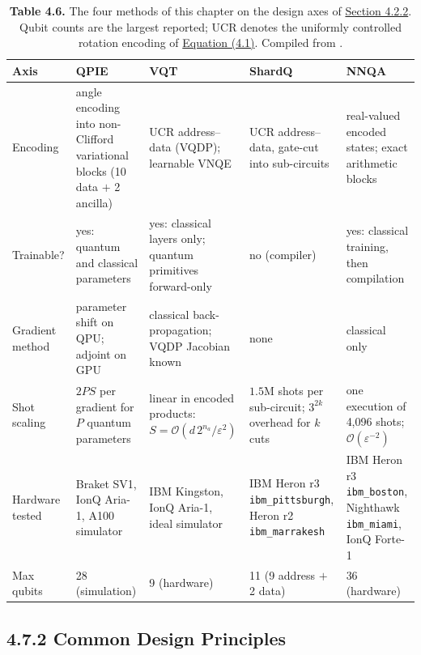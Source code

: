 \documentclass{report}
\theoremstyle{plain}
\theoremstyle{definition}
\theoremstyle{remark}
\newcommand{\bigO}[1]{\mathcal{O}\!\left(#1\right)}
\newcommand{\eps}{\varepsilon}
\begin{document}
\begin{table}[htbp]
\caption{\textbf{Table 4.6.} The four methods of this chapter on the design axes of \hyperref[sec:qml:prelim:axes]{Section 4.2.2}. Qubit counts are the largest reported; UCR denotes the uniformly controlled rotation encoding of \hyperref[eq:qml:qcrank]{Equation (4.1)}. Compiled from \cite{guo2025qpie,guo2025vqt,guo2025shardq,guo2026nnqa}.}\label{tab:qml:synthesis}
 
\footnotesize

\begin{tabular}{lllll}
\toprule
Axis & QPIE & VQT & ShardQ & NNQA \\
\midrule
Encoding & angle encoding into non-Clifford variational blocks (10 data $+$ 2 ancilla) & UCR address--data (VQDP); learnable VNQE & UCR address--data, gate-cut into sub-circuits & real-valued encoded states; exact arithmetic blocks \\

Trainable? & yes: quantum and classical parameters & yes: classical layers only; quantum primitives forward-only & no (compiler) & yes: classical training, then compilation \\

Gradient method & parameter shift on QPU; adjoint on GPU & classical back-propagation; VQDP Jacobian known & none & classical only \\

Shot scaling & $2PS$ per gradient for $P$ quantum parameters & linear in encoded products: $S=\bigO{d\,2^{n_a}/\eps^2}$ & $1.5$M shots per sub-circuit; $3^{2k}$ overhead for $k$ cuts & one execution of 4,096 shots; $\bigO{\eps^{-2}}$ \\

Hardware tested & Braket SV1, IonQ Aria-1, A100 simulator & IBM Kingston, IonQ Aria-1, ideal simulator & IBM Heron r3 \texttt{ibm\_pittsburgh}, Heron r2 \texttt{ibm\_marrakesh} & IBM Heron r3 \texttt{ibm\_boston}, Nighthawk \texttt{ibm\_miami}, IonQ Forte-1 \\

Max qubits & 28 (simulation) & 9 (hardware) & 11 (9 address $+$ 2 data) & 36 (hardware) \\
\bottomrule
\end{tabular}
\end{table}

\subsection{4.7.2 Common Design Principles}\label{sec:qml:synthesis:principles}
\end{document}
